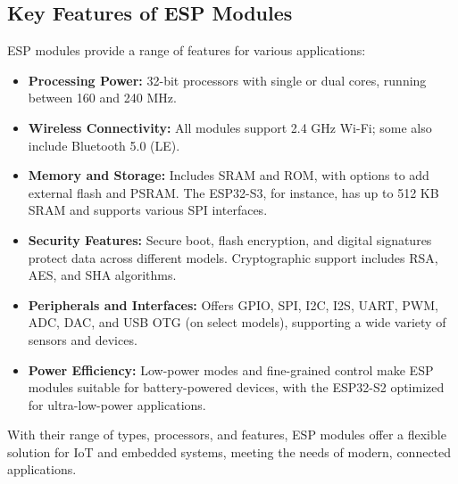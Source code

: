 \subsection{Key Features of ESP Modules}

ESP modules provide a range of features for various applications:

\begin{itemize}
	\item \textbf{Processing Power:} 32-bit processors with single or dual cores, running between 160 and 240 MHz.
	
	\item \textbf{Wireless Connectivity:} All modules support 2.4 GHz Wi-Fi; some also include Bluetooth 5.0 (LE).
	
	\item \textbf{Memory and Storage:} Includes SRAM and ROM, with options to add external flash and PSRAM. The ESP32-S3, for instance, has up to 512 KB SRAM and supports various SPI interfaces.
	
	\item \textbf{Security Features:} Secure boot, flash encryption, and digital signatures protect data across different models. Cryptographic support includes RSA, AES, and SHA algorithms.
	
	\item \textbf{Peripherals and Interfaces:} Offers GPIO, SPI, I2C, I2S, UART, PWM, ADC, DAC, and USB OTG (on select models), supporting a wide variety of sensors and devices.
	
	\item \textbf{Power Efficiency:} Low-power modes and fine-grained control make ESP modules suitable for battery-powered devices, with the ESP32-S2 optimized for ultra-low-power applications.
\end{itemize}

With their range of types, processors, and features, ESP modules offer a flexible solution for IoT and embedded systems, meeting the needs of modern, connected applications.
